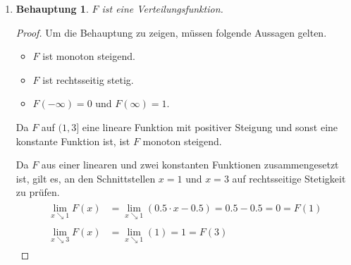 \documentclass[a4paper]{scrartcl}
\newtheorem*{behaupt}{Behauptung}
\begin{document}
\begin{enumerate}[label=\bfseries\arabic*.]
\begin{enumerate}[label=(\alph*)]
            \item
                \begin{behaupt}
                    $F$ ist eine Verteilungsfunktion.
                \end{behaupt}
                \begin{proof}
                    Um die Behauptung zu zeigen, müssen folgende Aussagen
                    gelten.
                    \begin{itemize}
                        \item $F$ ist monoton steigend.
                        \item $F$ ist rechtsseitig stetig.
                        \item $F(-\infty) = 0$ und $F(\infty) = 1$.
                    \end{itemize}

                    Da $F$ auf $(1, 3]$ eine lineare Funktion mit positiver
                    Steigung und sonst eine konstante Funktion ist, ist $F$
                    monoton steigend.

                    Da $F$ aus einer linearen und zwei konstanten Funktionen
                    zusammengesetzt ist, gilt es, an den Schnittstellen $x = 1$
                    und $x = 3$ auf rechtsseitige Stetigkeit zu prüfen.
                    \begin{align*}
                        \begin{split}
                            \lim_{x \searrow 1} F(x)
                            &= \lim_{x \searrow 1}
                            ( \num{0,5} \cdot x - \num{0,5})
                            = \num{0,5} - \num{0,5}
                            = 0
                            = F(1)
                        \end{split} \\
                        \begin{split}
                            \lim_{x \searrow 3} F(x)
                            &= \lim_{x \searrow 1} (1)
                            = 1
                            = F(3)
                        \end{split}
                    \end{align*}


\end{proof}
\end{enumerate}
\end{enumerate}
\end{document}
